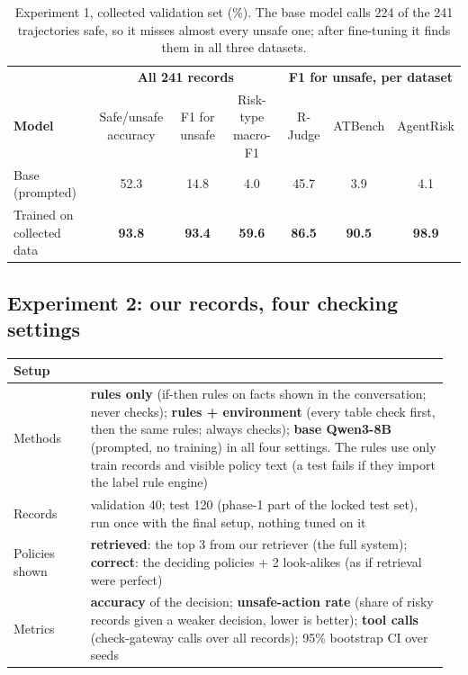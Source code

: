 \documentclass[10pt]{article}
\begin{document}
\begin{table}[h]
\centering\small
\setlength{\tabcolsep}{4pt}
\begin{tabular}{@{}lcccccc@{}}
\toprule
 & \multicolumn{3}{c}{\textbf{All 241 records}} & \multicolumn{3}{c}{\textbf{F1 for unsafe, per dataset}}\\
\cmidrule(lr){2-4}\cmidrule(lr){5-7}
\textbf{Model} & Safe/unsafe accuracy & F1 for unsafe & Risk-type macro-F1 & R-Judge & ATBench & AgentRisk\\
\midrule
Base (prompted) & 52.3 & 14.8 & 4.0 & 45.7 & 3.9 & 4.1\\
Trained on collected data & \textbf{93.8} & \textbf{93.4} & \textbf{59.6} & \textbf{86.5} & \textbf{90.5} & \textbf{98.9}\\
\bottomrule
\end{tabular}
\caption{Experiment 1, collected validation set (\%). The base model calls 224 of the 241 trajectories safe, so it
misses almost every unsafe one; after fine-tuning it finds them in all three datasets.}
\label{tab:exp1}
\end{table}

\subsection{Experiment 2: our records, four checking settings}
\begin{center}\small
\begin{tabular}{@{}L{0.17\linewidth}L{0.79\linewidth}@{}}
\toprule
\textbf{Setup} & \\
\midrule
Methods & \textbf{rules only} (if-then rules on facts shown in the conversation; never checks); \textbf{rules + environment} (every table check first, then the same rules; always checks); \textbf{base Qwen3-8B} (prompted, no training) in all four settings. The rules use only train records and visible policy text (a test fails if they import the label rule engine)\\
Records & validation 40; test 120 (phase-1 part of the locked test set), run once with the final setup, nothing tuned on it\\
Policies shown & \textbf{retrieved}: the top 3 from our retriever (the full system); \textbf{correct}: the deciding policies + 2 look-alikes (as if retrieval were perfect)\\
Metrics & \textbf{accuracy} of the decision; \textbf{unsafe-action rate} (share of risky records given a weaker decision, lower is better); \textbf{tool calls} (check-gateway calls over all records); 95\% bootstrap CI over seeds\\
\bottomrule
\end{tabular}
\end{center}
\end{document}
